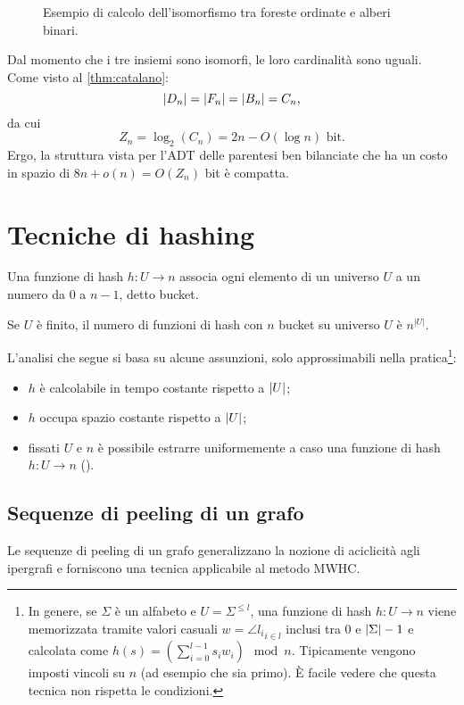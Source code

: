 \begin{figure}[ht]
	\centering
	
	\caption{Esempio di calcolo dell'isomorfismo tra foreste ordinate e alberi binari.}
	\label{fig:iso_forest_bintree_example}
\end{figure}

Dal momento che i tre insiemi sono isomorfi, le loro cardinalità sono uguali. Come visto al \cref{thm:catalano}:
\begin{equation*}
	| D_n |=| F_n |=| B_n |=C_n \text,
\end{equation*}
da cui
\begin{equation*}
	Z_n=\log_2(C_n)=2n-O(\log n) \text{ bit}.
\end{equation*}
Ergo, la struttura vista per l'ADT delle parentesi ben bilanciate che ha un costo in spazio di $8n+o(n)=O(Z_n)$ bit è compatta.



\section{Tecniche di hashing}
Una funzione di hash $h:U\to n$ associa ogni elemento di un universo $U$ a un numero da $0$ a $n-1$, detto bucket.

Se $U$ è finito, il numero di funzioni di hash con $n$ bucket su universo $U$ è $n^{|U|}$.

L'analisi che segue si basa su alcune assunzioni, solo approssimabili nella pratica\footnote{
	In genere, se $\Sigma$ è un alfabeto e $U=\Sigma^{\leq l}$, una funzione di hash $h: U\to n$ viene memorizzata tramite valori casuali $w=\angle{l_i}_{i\in l}$ inclusi tra $0$ e $| \Sigma |-1$ e calcolata come $h(s)=\left(\sum_{i=0}^{l-1} s_i w_i\right) \mod n$. Tipicamente vengono imposti vincoli su $n$ (ad esempio che sia primo). È facile vedere che questa tecnica non rispetta le condizioni.
}:
\begin{itemize}
	\item $h$ è calcolabile in tempo costante rispetto a $| U |$;
	\item $h$ occupa spazio costante rispetto a $| U |$;
	\item fissati $U$ e $n$ è possibile estrarre uniformemente a caso una funzione di hash $h:U\to n$ ().
\end{itemize}


\subsection{Sequenze di peeling di un grafo}
Le sequenze di peeling di un grafo generalizzano la nozione di aciclicità agli ipergrafi e forniscono una tecnica applicabile al metodo MWHC.

